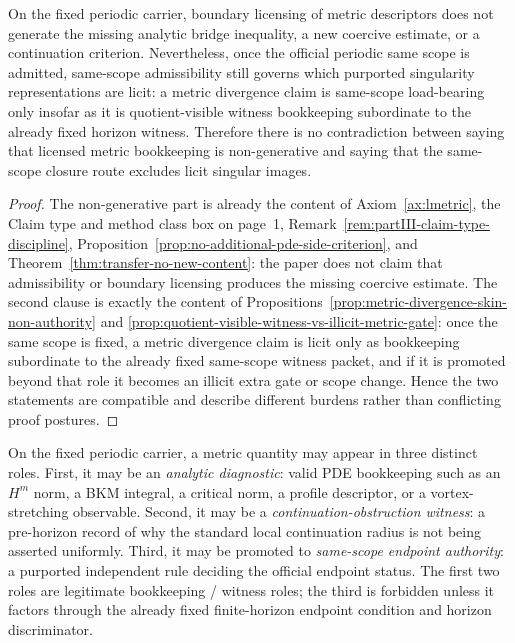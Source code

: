 \begin{manualproposition}
\label{prop:boundary-licensing-same-scope-compatibility}
On the fixed periodic carrier, boundary licensing of metric descriptors does not generate the missing analytic bridge inequality, a new coercive estimate, or a continuation criterion. Nevertheless, once the official periodic same scope is admitted, same-scope admissibility still governs which purported singularity representations are licit: a metric divergence claim is same-scope load-bearing only insofar as it is quotient-visible witness bookkeeping subordinate to the already fixed horizon witness. Therefore there is no contradiction between saying that licensed metric bookkeeping is non-generative and saying that the same-scope closure route excludes licit singular images.
\end{manualproposition}

\begin{proof}
The non-generative part is already the content of Axiom~\ref{ax:lmetric}, the Claim type and method class box on page~1, Remark~\ref{rem:partIII-claim-type-discipline}, Proposition~\ref{prop:no-additional-pde-side-criterion}, and Theorem~\ref{thm:transfer-no-new-content}: the paper does not claim that admissibility or boundary licensing produces the missing coercive estimate. The second clause is exactly the content of Propositions~\ref{prop:metric-divergence-skin-non-authority} and \ref{prop:quotient-visible-witness-vs-illicit-metric-gate}: once the same scope is fixed, a metric divergence claim is licit only as bookkeeping subordinate to the already fixed same-scope witness packet, and if it is promoted beyond that role it becomes an illicit extra gate or scope change. Hence the two statements are compatible and describe different burdens rather than conflicting proof postures.
\end{proof}



\begin{manualdefinition}
\label{def:metric-quantity-three-roles}
On the fixed periodic carrier, a metric quantity may appear in three distinct roles. First, it may be an \emph{analytic diagnostic}: valid PDE bookkeeping such as an $H^m$ norm, a BKM integral, a critical norm, a profile descriptor, or a vortex-stretching observable. Second, it may be a \emph{continuation-obstruction witness}: a pre-horizon record of why the standard local continuation radius is not being asserted uniformly. Third, it may be promoted to \emph{same-scope endpoint authority}: a purported independent rule deciding the official endpoint status. The first two roles are legitimate bookkeeping / witness roles; the third is forbidden unless it factors through the already fixed finite-horizon endpoint condition and horizon discriminator.
\end{manualdefinition}


